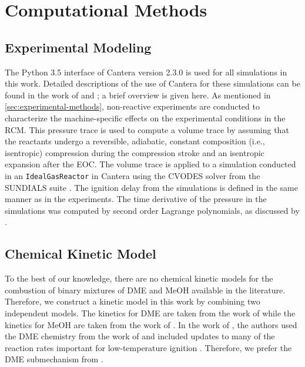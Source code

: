 \documentclass[12pt]{../ussci}
\begin{document}
\section{Computational Methods}\label{sec:computational-methods}
\subsection{Experimental Modeling}\label{sec:experimental-modeling}

The Python 3.5 interface of Cantera \autocite{cantera} version 2.3.0 is used for
all simulations in this work. Detailed descriptions of the use of Cantera for
these simulations can be found in the work of \textcite{Weber2016a} and
\textcite{Dames2016}; a brief overview is given here. As mentioned in
\cref{sec:experimental-methods}, non-reactive experiments are conducted to
characterize the machine-specific effects on the experimental conditions in the
RCM. This pressure trace is used to compute a volume trace by assuming that the
reactants undergo a reversible, adiabatic, constant composition (i.e.,
isentropic) compression during the compression stroke and an isentropic
expansion after the EOC. The volume trace is applied to a simulation conducted
in an \verb|IdealGasReactor| in Cantera \autocite{cantera} using the CVODES
solver from the SUNDIALS suite \autocite{Hindmarsh2005}. The ignition delay from
the simulations is defined in the same manner as in the experiments. The time
derivative of the pressure in the simulations was computed by second order
Lagrange polynomials, as discussed by \textcite{Chapra2010}.

\subsection{Chemical Kinetic Model}\label{sec:chemical-kinetic-model}

To the best of our knowledge, there are no chemical kinetic models for the
combustion of binary mixtures of DME and MeOH available in the literature.
Therefore, we construct a kinetic model in this work by combining two
independent models. The kinetics for DME are taken from the work of
\textcite{Dames2016} while the kinetics for MeOH are taken from the work of
\textcite{Burke2016}. In the work of \textcite{Dames2016}, the authors used the
DME chemistry from the work of \textcite{Burke2015a} and included updates to
many of the reaction rates important for low-temperature ignition
\autocite{Dames2016}. Therefore, we prefer the DME submechanism from
\textcite{Dames2016}.
\end{document}
